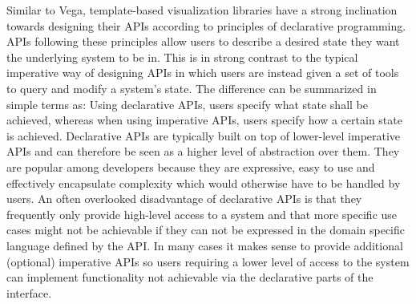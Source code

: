 Similar to Vega, template-based visualization libraries have a strong inclination towards designing their APIs according to principles of declarative programming. 
APIs following these principles allow users to describe a desired state they want the underlying system to be in. 
This is in strong contrast to the typical imperative way of designing APIs in which users are instead given a set of tools to query and modify a system's state. 
The difference can be summarized in simple terms as: Using declarative APIs, users specify what state shall be achieved, whereas when using imperative APIs, users specify how a certain state is achieved. 
Declarative APIs are typically built on top of lower-level imperative APIs and can therefore be seen as a higher level of abstraction over them. 
They are popular among developers because they are expressive, easy to use and effectively encapsulate complexity which would otherwise have to be handled by users. 
An often overlooked disadvantage of declarative APIs is that they frequently only provide high-level access to a system and that more specific use cases might not be achievable if they can not be expressed in the domain specific language defined by the API. 
In many cases it makes sense to provide additional (optional) imperative APIs so users requiring a lower level of access to the system can implement functionality not achievable via the declarative parts of the interface.


